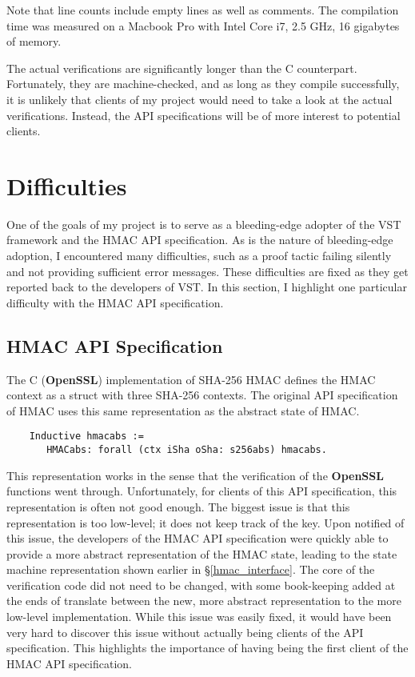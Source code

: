 \documentclass[pageno]{jpaper}
\newcommand{\stdtitle}[1]{\textbf{#1}}
\begin{document}
Note that line counts include empty lines as well as comments. The compilation time was measured on a Macbook Pro with Intel Core i7, 2.5 GHz, 16 gigabytes of memory.

The actual verifications are significantly longer than the C counterpart. Fortunately, they are machine-checked, and as long as they compile successfully, it is unlikely that clients of my project would need to take a look at the actual verifications. Instead, the API specifications will be of more interest to potential clients.

\section{Difficulties}

One of the goals of my project is to serve as a bleeding-edge adopter of the VST framework and the HMAC API specification. As is the nature of bleeding-edge adoption, I encountered many difficulties, such as a proof tactic failing silently and not providing sufficient error messages. These difficulties are fixed as they get reported back to the developers of VST. In this section, I highlight one particular difficulty with the HMAC API specification.


\subsection{HMAC API Specification}

The C (\stdtitle{OpenSSL}) implementation of SHA-256 HMAC defines the HMAC context as a struct with three SHA-256 contexts. The original API specification of HMAC \cite{hmac} uses this same representation as the abstract state of HMAC.

\begin{lstlisting}
    Inductive hmacabs :=
       HMACabs: forall (ctx iSha oSha: s256abs) hmacabs.
\end{lstlisting}

This representation works in the sense that the verification of the \stdtitle{OpenSSL} functions went through. Unfortunately, for clients of this API specification, this representation is often not good enough. The biggest issue is that this representation is too low-level; it does not keep track of the key. Upon notified of this issue, the developers of the HMAC API specification were quickly able to provide a more abstract representation of the HMAC state, leading to the state machine representation shown earlier in \S \ref{hmac_interface}. The core of the verification code did not need to be changed, with some book-keeping added at the ends of translate between the new, more abstract representation to the more low-level implementation. While this issue was easily fixed, it would have been very hard to discover this issue without actually being clients of the API specification. This highlights the importance of having being the first client of the HMAC API specification.
\end{document}
